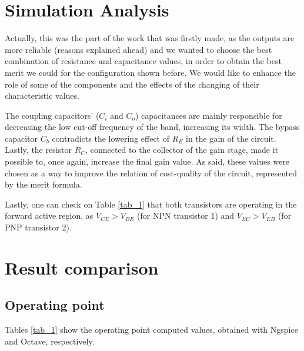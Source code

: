 \section{Simulation Analysis}
\label{sec:simulation}
\captionsetup[table]{skip=10pt}

\vspace{5mm}
\par Actually, this was the part of the work that was firstly made, as the outputs are more reliable (reasons explained ahead) and we wanted to choose the best combination of resistance and capacitance values, in order to obtain the best merit we could for the configuration shown before. We would like to enhance the role of some of the components and the effects of the changing of their characteristic values. 

\vspace{3mm}
\par The coupling capacitors' ($C_i$ and $C_o$) capacitances are mainly responsible for decreasing the low cut-off frequency of the band, increasing its width. The bypass capacitor $C_b$ contradicts the lowering effect of $R_E$ in the gain of the circuit. Lastly, the resistor $R_C$, connected to the collector of the gain stage, made it possible to, once again, increase the final gain value. As said, these values were chosen as a way to improve the relation of cost-quality of the circuit, represented by the merit formula.

\vspace{3mm}
\par Lastly, one can check on Table \ref{tab_1} that both transistors are operating in the forward active region, as $V_{CE}>V_{BE}$ (for NPN transistor 1) and $V_{EC}>V_{EB}$ (for PNP transistor 2).


\section{Result comparison}
\label{sec:results}
\captionsetup[table]{skip=10pt}

\vspace{3mm}
\subsection{Operating point}

\vspace{5mm}
\par Tables \ref{tab_1} show the operating point computed values, obtained with Ngspice and Octave, respectively.

